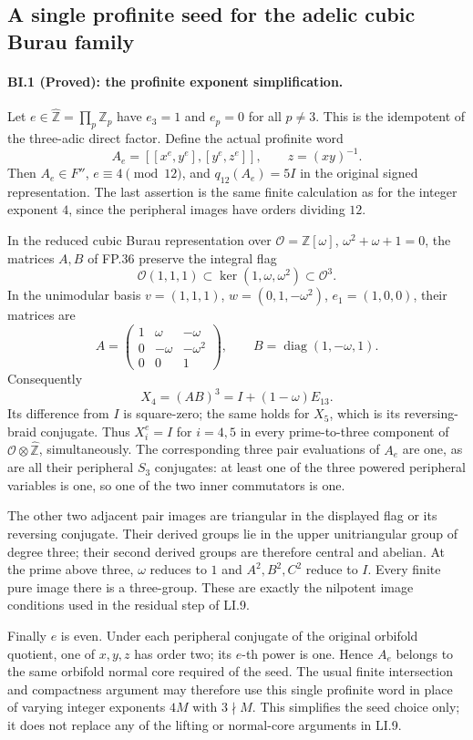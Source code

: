 \subsection*{A single profinite seed for the adelic cubic Burau family}

\paragraph{BI.1 (Proved): the profinite exponent simplification.}
Let $e\in\widehat{\mathbb Z}=\prod_p\mathbb Z_p$ have
$e_3=1$ and $e_p=0$ for all $p\ne3$. This is the idempotent
of the three-adic direct factor. Define the actual profinite word
\[
 A_e=[[x^e,y^e],[y^e,z^e]],\qquad z=(xy)^{-1}.
\]
Then $A_e\in F''$, $e\equiv4\pmod{12}$, and
$q_{12}(A_e)=5I$ in the original signed representation.
The last assertion is the same finite calculation as for the
integer exponent $4$, since the peripheral images have orders
dividing $12$.

In the reduced cubic Burau representation over
$\mathcal O=\mathbb Z[\omega]$, $\omega^2+\omega+1=0$,
the matrices $A,B$ of FP.36 preserve the integral flag
\[
 \mathcal O(1,1,1)\subset
 \ker(1,\omega,\omega^2)\subset\mathcal O^3.
\]
In the unimodular basis
$v=(1,1,1)$, $w=(0,1,-\omega^2)$, $e_1=(1,0,0)$,
their matrices are
\[
 A=\begin{pmatrix}1&\omega&-\omega\\
                  0&-\omega&-\omega^2\\0&0&1\end{pmatrix},
 \qquad B=\operatorname{diag}(1,-\omega,1).
\]
Consequently
\[
 X_4=(AB)^3=I+(1-\omega)E_{13}.
\]
Its difference from $I$ is square-zero; the same holds for
$X_5$, which is its reversing-braid conjugate. Thus
$X_i^e=I$ for $i=4,5$ in every prime-to-three component
of $\mathcal O\otimes\widehat{\mathbb Z}$, simultaneously.
The corresponding three pair evaluations of $A_e$ are one,
as are all their peripheral $S_3$ conjugates: at least one
of the three powered peripheral variables is one, so one
of the two inner commutators is one.

The other two adjacent pair images are triangular in the
displayed flag or its reversing conjugate. Their derived
groups lie in the upper unitriangular group of degree three;
their second derived groups are therefore central and abelian.
At the prime above three, $\omega$ reduces to $1$ and
$A^2,B^2,C^2$ reduce to $I$. Every finite pure image there
is a three-group. These are exactly the nilpotent image
conditions used in the residual step of LI.9.

Finally $e$ is even. Under each peripheral conjugate of the
original orbifold quotient, one of $x,y,z$ has order two;
its $e$-th power is one. Hence $A_e$ belongs to the same
orbifold normal core required of the seed. The usual finite
intersection and compactness argument may therefore use
this single profinite word in place of varying integer
exponents $4M$ with $3\nmid M$. This simplifies the seed
choice only; it does not replace any of the lifting or
normal-core arguments in LI.9.
